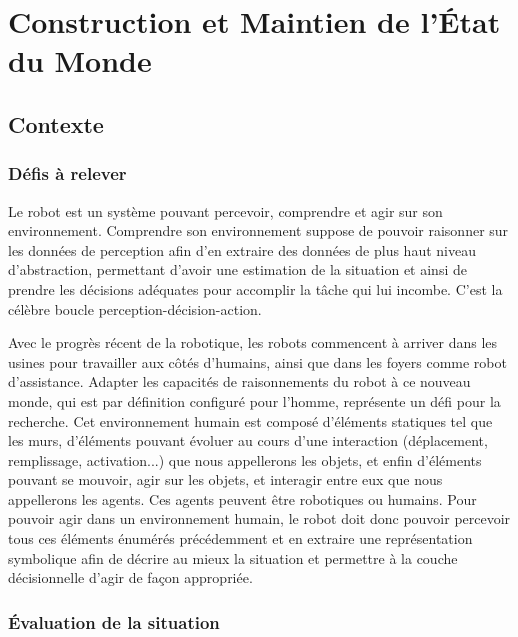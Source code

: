 \documentclass[a4paper,11pt,twoside]{StyleThese}
\begin{document}
\setcounter{chapter}{1} %
\dominitoc
\faketableofcontents
\fi

\chapter{Construction et Maintien de l'État du Monde}
\label{chapter1}
\minitoc


\section{Contexte}
\subsection{Défis à relever}
Le robot est un système pouvant percevoir, comprendre et agir sur son environnement. Comprendre son environnement suppose de pouvoir raisonner sur les données de perception afin d'en extraire des données de plus haut niveau d'abstraction, permettant d'avoir une estimation de la situation et ainsi de prendre les décisions adéquates pour accomplir la tâche qui lui incombe. C'est la célèbre boucle perception-décision-action.

Avec le progrès récent de la robotique, les robots commencent à arriver dans les usines pour travailler aux côtés d'humains, ainsi que dans les foyers comme robot d'assistance. Adapter les capacités de raisonnements du robot à ce nouveau monde, qui est par définition configuré pour l'homme, représente un défi pour la recherche. Cet environnement humain est composé
d'éléments statiques tel que les murs, d'éléments pouvant évoluer au cours d'une interaction (déplacement, remplissage, activation...) que nous appellerons les objets, et enfin d'éléments pouvant se mouvoir, agir sur les objets, et interagir entre eux que nous appellerons les agents. Ces agents peuvent être robotiques ou humains.
Pour pouvoir agir dans un environnement humain, le robot doit donc pouvoir percevoir tous ces éléments énumérés précédemment et en extraire une représentation symbolique afin de décrire au mieux la situation et permettre à la couche décisionnelle d'agir de façon appropriée.


\subsection{Évaluation de la situation}
\label{sec:evaSit}
\end{document}
